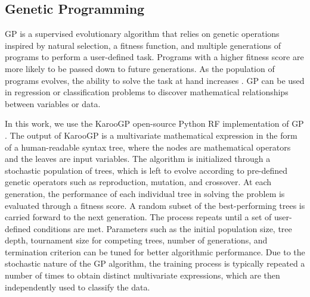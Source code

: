 \subsection*{Genetic Programming}

\ac{GP} is a supervised evolutionary algorithm \cite{Koza1992} that relies on genetic operations inspired by natural selection, a fitness function, and multiple generations of
programs to perform a user-defined task. Programs with a higher fitness score are more likely to be passed down to future generations. As the population of programs
evolves, the ability to solve the task at hand increases \cite{StaatsThesis}. \ac{GP} can be used in regression or classification problems to discover mathematical relationships
between variables or data. 

In this work, we use the KarooGP open-source Python \ac{RF} implementation of \ac{GP} \cite{KarooGP,KarooPYPI}. The output of KarooGP is a multivariate mathematical expression
in the form of a human-readable syntax tree, where the nodes are mathematical operators and the leaves are input variables. The algorithm is initialized through a stochastic
population of trees, which is left to evolve according to pre-defined genetic operators such as reproduction, mutation, and crossover. At each generation, the performance of each
individual tree in solving the problem is evaluated through a fitness score. A random subset of the best-performing trees is carried forward to the next generation. The process
repeats until a set of user-defined conditions are met. Parameters such as the initial population size, tree depth, tournament size for competing trees, number of generations, and
termination criterion can be tuned for better algorithmic performance. Due to the stochastic nature of the \ac{GP} algorithm, the training process is typically repeated a number of times to obtain distinct multivariate expressions, which are then independently used to classify the data. 
